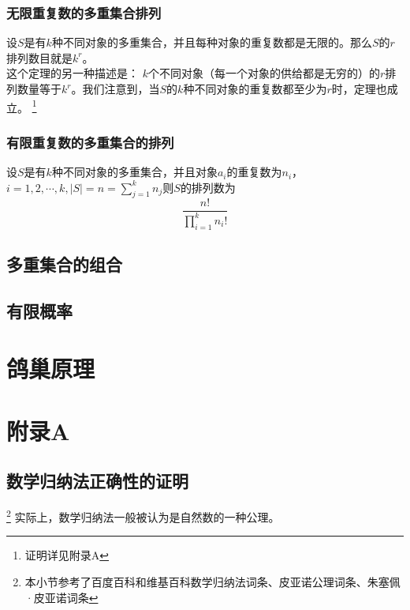 \documentclass{ctexart}
\begin{document}
   \subsubsection{无限重复数的多重集合排列}
   设$S$是有$k$种不同对象的多重集合，并且每种对象的重复数都是无限的。那么$S$的$r$排列数目就是$k^r$。\\
   这个定理的另一种描述是： $k$个不同对象（每一个对象的供给都是无穷的）的$r$排列数量等于$k^r$。我们注意到，当$S$的$k$种不同对象的重复数都至少为$r$时，定理也成立。
\footnote{证明详见附录A}
   \subsubsection{有限重复数的多重集合的排列}
   设$S$是有$k$种不同对象的多重集合，并且对象$a_i$的重复数为$n_i$，$i = 1,2,\cdots,k,|S| = n = \sum_{j=1}^k n_j$则$S$的排列数为
   \[\frac{n!}{\prod_{i=1}^k n_i!}\]
   \subsection{多重集合的组合} 
   \subsection{有限概率}
   \section{鸽巢原理}
   \section{附录A}
    \subsection{数学归纳法正确性的证明}
    \footnote{本小节参考了百度百科和维基百科数学归纳法词条、皮亚诺公理词条、朱塞佩·皮亚诺词条}
    实际上，数学归纳法一般被认为是自然数的一种公理。
\end{document}
